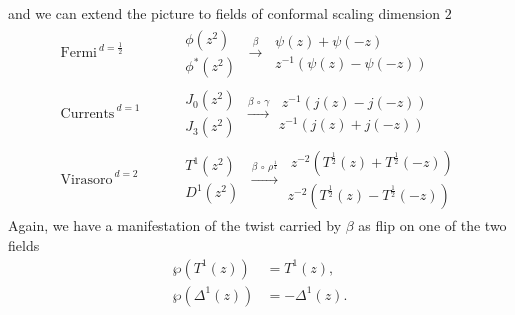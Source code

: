  and we can extend the picture to fields of conformal scaling
 dimension $2$
 \begin{align*}
 {\text{Fermi}}^{\ d=\frac{1}{2}}& \qquad
             \begin{matrix}
             \phi(z^2)\\[1ex]
             \phi^*(z^2)
             \end{matrix}\
             \overset{\beta}{\longrightarrow}\
             \begin{matrix}
             \psi(z)+\psi(-z)\\[1ex]
             z^{-1}\left(\psi(z)-\psi(-z)\right)
             \end{matrix}\\[3ex]
 {\text{Currents}}^{\ d=1}&\qquad
             \begin{matrix}
             J_0(z^2)\\[1ex]
             J_3(z^2)
             \end{matrix}\
             \xrightarrow[]{\beta\,\circ\,\gamma}
             \begin{matrix}\
             z^{-1}\left(j(z)-j(-z)\right)\\[1ex]
             z^{-1}\left(j(z)+j(-z)\right)
             \end{matrix}\\[3ex]
 {\text{Virasoro}}^{\ d=2}&\qquad
             \begin{matrix}
             T^1(z^2)\\[1ex]
             D^1(z^2)
             \end{matrix}\
             \xrightarrow[]{\beta\,\circ\,\rho^{\frac{1}{4}}}
             \begin{matrix}\
             z^{-2}\left(T^{\frac{1}{2}}(z)+T^{\frac{1}{2}}(-z)\right)\\[1ex]
             z^{-2}\left(T^{\frac{1}{2}}(z)-T^{\frac{1}{2}}(-z)\right)
             \end{matrix}
 \end{align*}
 Again, we have a manifestation of the twist carried by $\beta$
 as flip on one of the two fields
 \begin{align*}
 \wp\left(T^1(z)\right)&=T^1(z),\\
 \wp\left({\Delta}^1(z)\right)&=-{\Delta}^1(z).
 \end{align*}

 
